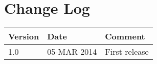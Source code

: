 \documentclass[Main]{subfiles}
\begin{document}
\section*{Change Log}

\begin{table}[H]

\begin{tabular}{p{} p{} p{}}
\hline
\textbf{Version} & \textbf{Date} & \textbf{Comment} \\\hline
1.0 & 05-MAR-2014 & First release\\
\hline
\end{tabular}

\end{table}
\end{document}
